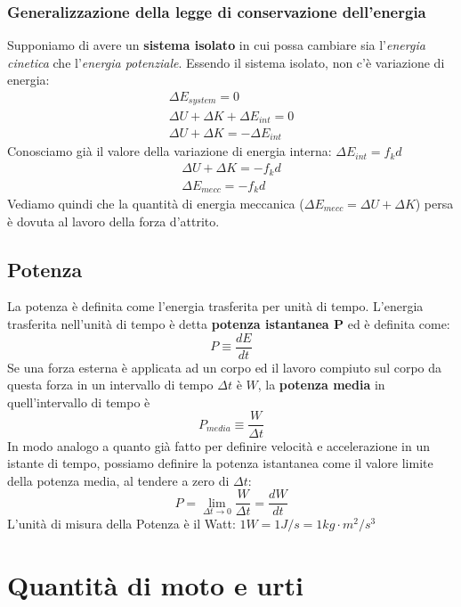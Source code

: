 \documentclass[a4paper,11pt,oneside]{book}
\begin{document}
\subsection{Generalizzazione della legge di conservazione dell'energia}
Supponiamo di avere un \textbf{sistema isolato} in cui possa cambiare sia l'\emph{energia cinetica} che l'\emph{energia potenziale}.
Essendo il sistema isolato, non c'è variazione di energia:
\begin{gather*}
    \Delta E_{system} = 0 \\
    \Delta U + \Delta K + \Delta E_{int} = 0 \\
    \Delta U + \Delta K = -\Delta E_{int}
\end{gather*}
Conosciamo già il valore della variazione di energia interna: $\Delta E_{int} = f_k d$
\begin{gather*}
    \Delta U + \Delta K = -f_k d\\ 
    \Delta E_{mecc} = -f_k d
\end{gather*}
Vediamo quindi che la quantità di energia meccanica ($\Delta E_{mecc} = \Delta U + \Delta K$) persa è dovuta al lavoro della forza d'attrito.

\section{Potenza}
La potenza è definita come l'energia trasferita per unità di tempo. L’energia trasferita nell’unità di tempo è detta \textbf{potenza istantanea P} ed è definita come:
\begin{equation*}
    P \equiv \frac{dE}{dt}
\end{equation*}
Se una forza esterna è applicata ad un corpo ed il lavoro compiuto sul corpo da questa forza in un intervallo di tempo $\Delta t$ è $W$, la \textbf{potenza media} in quell'intervallo 
di tempo è
\begin{equation*}
    P_{media} \equiv \frac{W}{\Delta t}
\end{equation*}
In modo analogo a quanto già fatto per definire velocità e accelerazione in un istante di tempo, possiamo definire la potenza istantanea come il valore limite della potenza media, al tendere a zero di $\Delta t$:
\begin{equation*}
    P = \lim_{\Delta t \to 0} \frac{W}{\Delta t} = \frac{dW}{dt}
\end{equation*}
L'unità di misura della Potenza è il Watt: $1W = 1J/s = 1kg \cdot m^2/s^3$

\chapter{Quantità di moto e urti}
\end{document}

